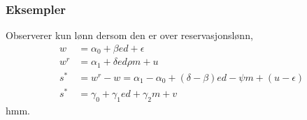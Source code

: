 \subsubsection{Eksempler}
Observerer kun lønn dersom den er over reservasjonslønn,
\begin{align}
w &= \alpha_0 + \beta ed + \epsilon \\
w^r&=\alpha_1 + \delta ed \rho m + u \\
s^* &= w^r-w = \alpha_1-\alpha_0 + (\delta-\beta) ed - \psi m + (u-\epsilon) \\
s^* &= \gamma_0 + \gamma_1 ed + \gamma_2 m + v
\end{align}
hmm.
